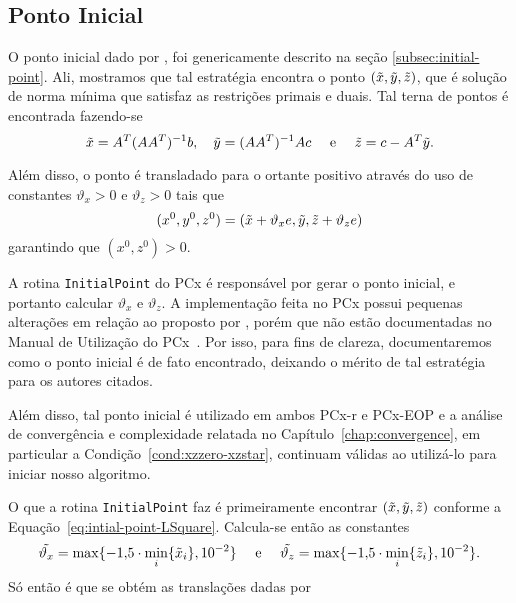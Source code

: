 \subsection{Ponto Inicial}

O ponto inicial dado por \textcite{Mehrotra:1992wr}, foi genericamente descrito na seção \ref{subsec:initial-point}. Ali, mostramos que tal estratégia encontra o ponto $(\tilde{x},\tilde{y},\tilde{z})$, que é solução de norma mínima que satisfaz as restrições primais e
duais. Tal terna de pontos é encontrada fazendo-se
\begin{equation}
	\label{eq:intial-point-LSquare}
	\tilde{x} = A^T(AA^T)^{-1}b, \quad \tilde{y} = (AA^T)^{-1}Ac\quad \text{ e }
\quad \tilde{z} = c - A^T\tilde{y}.
\end{equation}

Além disso, o ponto é transladado para o ortante positivo 
através do uso de constantes  $\vartheta_x>0$ e $\vartheta_ z>0$ tais que  
\begin{equation}
	\label{eq:intial-point-generated}
(x^0,y^0,z^0) = (\tilde{x}+ \vartheta_x e,\tilde{y},\tilde{z}+\vartheta_z e)
\end{equation}
garantindo que $(x^0,z^0)>0$.


 A rotina \verb|InitialPoint| do PCx é responsável por gerar o ponto inicial, e portanto calcular  $\vartheta_x$ e $\vartheta_ z$. A implementação feita no PCx possui  pequenas alterações em relação ao proposto por \citeauthor{Mehrotra:1992wr}, porém que não  estão documentadas no Manual de Utilização do PCx~\cite{Czyzyk:1998vw}. Por isso, para fins de clareza, documentaremos como o ponto inicial é de fato encontrado, deixando o mérito de tal estratégia para os autores citados.

  Além disso, tal ponto inicial é utilizado em ambos PCx-r e PCx-EOP e a análise de convergência e complexidade relatada no Capítulo~\ref{chap:convergence}, em particular a Condição~\ref{cond:xzzero-xzstar}, continuam válidas ao utilizá-lo para iniciar nosso algoritmo.

O que a rotina  \verb|InitialPoint| faz é primeiramente encontrar  $(\tilde{x},\tilde{y},\tilde{z})$ conforme a Equação~\eqref{eq:intial-point-LSquare}. Calcula-se então  as constantes
\begin{equation}
	\label{eq:initial-point-tilde-var}
\tilde{\vartheta_x} = \max\{\displaystyle\num{-1.5}\cdot\min_{i}\{\tilde{x}_{i}\},\num{e-2}\} \quad \text{ e }\quad  \tilde{\vartheta_z} = \max\{\displaystyle\num{-1.5}\cdot\min_{i}\{\tilde{z}_{i}\},\num{e-2}\}.
\end{equation}
Só então é que se obtém as translações dadas por 

